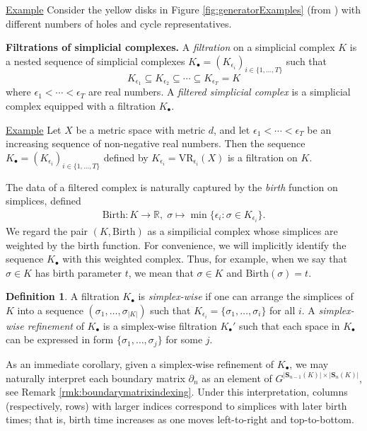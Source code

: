 \documentclass[utf8]{formatting_stuff/frontiersFPHY}
\newcommand{\R}{\mathbb{R}}
\newcommand{\Simplices}[0]{\mathbf{S}}
\newcommand{\fig}{Figure }
\newcommand{\birth}{\mathrm{Birth}}
\newcommand{\simplex}{\sigma}
\theoremstyle{plain}
\theoremstyle{definition}
\newtheorem{definition}[theorem]{Definition}
\begin{document}
\noindent \underline{Example} Consider the yellow disks in \fig \ref{fig:generatorExamples} (from  \cite{Carlsson2009TopologyAD}) with different numbers of holes and cycle representatives. 


 

\noindent \textbf{Filtrations of simplicial complexes.} A \emph{filtration} on a simplicial complex $K$ is a nested sequence of  simplicial complexes $K_\bullet = (K_{\epsilon_i})_{i \in\{ 1, \ldots, T\}}$ such that
    $$
    K_{\epsilon_1} \subseteq K_{\epsilon_2} \subseteq \cdots \subseteq K_{\epsilon_T} = K
    $$
where $\epsilon_1 < \cdots < \epsilon_T$ are real numbers. A \emph{filtered simplicial complex} is a simplicial complex equipped with a filtration $K_\bullet$.

\noindent \underline{Example}
 Let  $X$ be a metric space with metric $d$, and let  $\epsilon_1 < \cdots < \epsilon_T$ be an increasing sequence of non-negative real numbers.  Then the sequence $K_\bullet = (K_{\epsilon_i})_{i \in\{ 1, \ldots, T\}}$ defined by $K_{\epsilon_i} = \text{VR}_{\epsilon_i}(X)$ is a filtration on $K$.

The data of a filtered complex is naturally captured by the \emph{birth} function on simplices, defined
    \begin{align*}
        \birth: K \to \R, \; \simplex \mapsto \min\{ \epsilon_i : \simplex \in K_{\epsilon_i} \}.
    \end{align*}
We regard the pair $(K, \birth)$ as a simpilicial complex whose simplices are weighted by the birth function.   For convenience, we will implicitly identify the sequence $K_\bullet$ with this weighted complex.   Thus, for example, when we say that $\simplex \in K$ has birth parameter $t$, we mean that  $\sigma\in K$ and  $\birth(\sigma) = t$.


\begin{definition}
A filtration $K_\bullet$ is \emph{simplex-wise} if one can arrange the simplices of $K$ into a sequence $(\simplex_1, \ldots, \simplex_{|K|})$ such that $K_{\epsilon_i} = \{\simplex_1, \ldots, \simplex_i\}$ for all $i$.  
A \emph{simplex-wise refinement}  of $K_\bullet$ is a simplex-wise filtration $K_\bullet'$ such that each space in $K_\bullet$ can be expressed in form $\{\simplex_1, \ldots, \simplex_j\}$ for some $j$.
\end{definition}


As an immediate corollary, given a simplex-wise refinement of $K_\bullet$, we may naturally interpret each boundary matrix $\partial_n$ as an element of $G^{|\Simplices_{n-1}(K)| \times |\Simplices_{n}(K)|}$, see Remark \ref{rmk:boundarymatrixindexing}.  Under this interpretation, columns (respectively, rows) with larger indices correspond to simplices with later birth times; that is, birth time increases as one moves left-to-right and top-to-bottom.  
\end{document}
